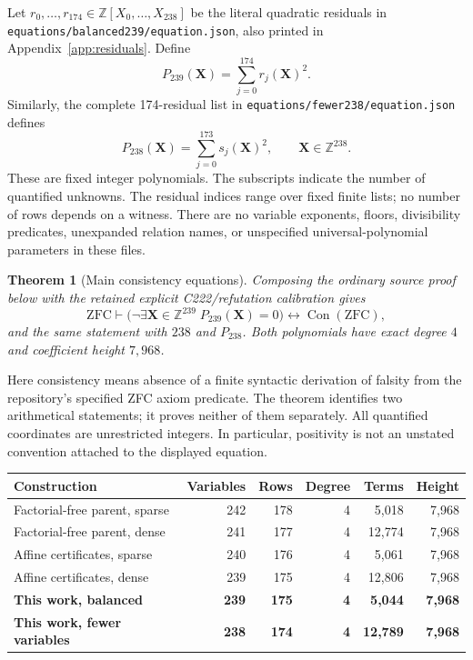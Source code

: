 \documentclass[11pt]{article}
\newcommand{\Z}{\mathbb Z}
\newcommand{\Con}{\operatorname{Con}}
\newcommand{\file}[1]{\nolinkurl{#1}}
\newtheorem{theorem}{Theorem}[section]
\theoremstyle{remark}\newtheorem{remark}[theorem]{Remark}
\begin{document}
Let $r_0,\ldots,r_{174}\in\Z[X_0,\ldots,X_{238}]$ be the literal
quadratic residuals in \file{equations/balanced239/equation.json}, also
printed in Appendix~\ref{app:residuals}. Define
\begin{equation}\label{eq:balanced}
  P_{239}(\mathbf X)=\sum_{j=0}^{174}r_j(\mathbf X)^2.
\end{equation}
Similarly, the complete 174-residual list in
\file{equations/fewer238/equation.json} defines
\begin{equation}\label{eq:fewer}
  P_{238}(\mathbf X)=\sum_{j=0}^{173}s_j(\mathbf X)^2,
  \qquad \mathbf X\in\Z^{238}.
\end{equation}
These are fixed integer polynomials. The subscripts indicate the number
of quantified unknowns. The residual indices range over fixed finite
lists; no number of rows depends on a witness. There are no variable
exponents, floors, divisibility predicates, unexpanded relation names,
or unspecified universal-polynomial parameters in these files.

\begin{theorem}[Main consistency equations]\label{thm:main}
Composing the ordinary source proof below with the retained explicit
C222/refutation calibration gives
\[
 \mathrm{ZFC}\vdash
 \bigl(\neg\exists\mathbf X\in\Z^{239}\;P_{239}(\mathbf X)=0\bigr)
 \longleftrightarrow\Con(\mathrm{ZFC}),
\]
and the same statement with $238$ and $P_{238}$.
Both polynomials have exact degree $4$ and coefficient height $7,968$.
\end{theorem}

Here consistency means absence of a finite syntactic derivation of falsity
from the repository's specified ZFC axiom predicate. The theorem identifies
two arithmetical statements; it proves neither of them separately.
All quantified coordinates are unrestricted integers. In particular,
positivity is not an unstated convention attached to the displayed equation.

\begin{center}\small
\begin{tabular}{lrrrrr}
\toprule
Construction & Variables & Rows & Degree & Terms & Height\\
\midrule
Factorial-free parent, sparse &242&178&4&5,018&7,968\\
Factorial-free parent, dense &241&177&4&12,774&7,968\\
Affine certificates, sparse &240&176&4&5,061&7,968\\
Affine certificates, dense &239&175&4&12,806&7,968\\
\textbf{This work, balanced} &\textbf{239}&\textbf{175}&\textbf{4}&\textbf{5,044}&\textbf{7,968}\\
\textbf{This work, fewer variables} &\textbf{238}&\textbf{174}&\textbf{4}&\textbf{12,789}&\textbf{7,968}\\
\bottomrule
\end{tabular}
\end{center}
\end{document}
